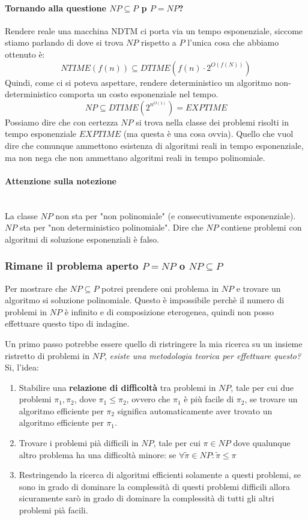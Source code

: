 \documentclass{article}
\begin{document}
\paragraph{Tornando alla questione $NP\subseteq P$ p $P=NP$?}
Rendere reale una macchina NDTM ci porta via un tempo esponenziale, siccome stiamo
parlando di dove si trova $NP$ rispetto a $P$ l'unica cosa che abbiamo ottenuto è:
$$NTIME(f(n))\subseteq DTIME(f(n)\cdot 2^{O(f(N))})$$
Quindi, come ci si poteva aspettare, rendere deterministico un algoritmo non-deterministico
comporta un costo esponenziale nel tempo.
$$NP\subseteq DTIME(2^{n^{O(1)}})=EXPTIME$$
Possiamo dire che con certezza $NP$ si trova nella classe dei problemi risolti in
tempo esponenziale $EXPTIME$ (ma questa è una cosa ovvia). Quello che vuol dire che comunque ammettono
esistenza di algoritmi reali in tempo esponenziale, ma non nega che non ammettano algoritmi
reali in tempo polinomiale.

\paragraph{Attenzione sulla notezione}\mbox{}\\
La classe $NP$ non sta per "non polinomiale" (e consecutivamente esponenziale). $NP$
sta per "non deterministico polinomiale". Dire che $NP$ contiene problemi con algoritmi
di soluzione esponenziali è falso.

\subsubsection{Rimane il problema aperto $P=NP$ o $NP\subseteq P$}
Per mostrare che $NP\subseteq P$ potrei prendere oni problema in $NP$ e trovare
un algoritmo si soluzione polinomiale. Questo è impossibile perchè il numero
di problemi in $NP$ è infinito e di composizione eterogenea, quindi non posso effettuare
questo tipo di indagine.

Un primo passo potrebbe essere quello di ristringere la mia ricerca su un insieme ristretto
di problemi in $NP$, \textit{esiste una metodologia teorica per effettuare questo?} Si,
l'idea:
\begin{enumerate}
    \item Stabilire una \textbf{relazione di difficoltà} tra problemi in $NP$, tale
          per cui due problemi $\pi_1,\pi_2$, dove $\pi_1\leq\pi_2$, ovvero che $\pi_1$ è
          più facile di $\pi_2$, se trovare un algoritmo efficiente per $\pi_2$ significa
          automaticamente aver trovato un algoritmo efficiente per $\pi_1$.

    \item Trovare i problemi pià difficili in $NP$, tale per cui $\pi\in NP$
          dove qualunque altro problema ha una difficoltà minore: se $\forall\tilde{\pi}\in NP:\tilde{\pi}\leq\pi$

    \item Restringendo la ricerca di algoritmi efficienti solamente a questi problemi, se sono
          in grado di dominare la complessità di questi problemi difficili allora sicuramente
          sarò in grado di dominare la complessità di tutti gli altri problemi pià facili.
\end{enumerate}
\end{document}
